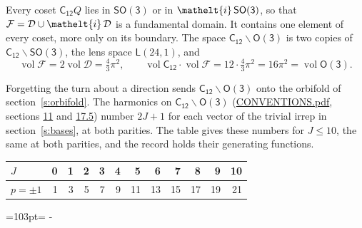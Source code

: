\documentclass[10pt,a4paper]{article}
\newcommand{\needspace}[1]{\par\penalty-100\begingroup\dimen0=#1\relax\dimen2=\pagegoal
  \advance\dimen2-\pagetotal\ifdim\dimen0>\dimen2\relax\ifdim\dimen2>0pt\vfil\break\fi\fi
  \endgroup}
\numberwithin{equation}{section}
\newcommand{\eltfont}[1]{{\let\sigma\eltsigma\mathelt{#1}}}
\newcommand{\grp}[1]{\mathsf{#1}}
\newcommand{\elt}[1]{\eltfont{#1}}
\newcommand{\vol}{\operatorname{vol}}
\newcommand{\fcell}{\mathcal{D}}
\newcommand{\fdomain}{\mathcal{F}}
\newcommand{\lensspace}[2]{\mathsf{L}(#1, #2)}
\begin{document}
\leavevmode\label{n:set.fundamental}Every coset $\grp{C_{12}}Q$ lies in \href{SO3.pdf}{$\grp{SO(3)}$} or in $\elt{i}\,\grp{SO(3)}$, so that $\fdomain = \fcell \cup \elt{i}\,\fcell$ is a fundamental domain. It contains one element of every coset, more only on its boundary.
\leavevmode\label{n:set.lens}The space $\grp{C_{12}}\backslash\grp{O(3)}$ is two copies of $\grp{C_{12}}\backslash\grp{SO(3)}$, the lens space $\lensspace{24}{1}$, and
\begin{equation}\label{e:volume}\vol\fdomain = 2\vol\fcell = \tfrac{4}{3}\pi^2,\qquad \vol\grp{C_{12}}\cdot\vol\fdomain = 12\cdot \tfrac{4}{3}\pi^2 = 16\pi^2 = \vol\grp{O(3)}.\end{equation}

Forgetting the turn about a direction sends $\grp{C_{12}}\backslash\grp{O(3)}$ onto the orbifold of section~\ref{s:orbifold}.
The harmonics on $\grp{C_{12}}\backslash\grp{O(3)}$ (\href{../../CONVENTIONS.pdf}{CONVENTIONS.pdf}, sections \href{../../CONVENTIONS.pdf\#conv.11}{11} and \href{../../CONVENTIONS.pdf\#conv.17.5}{17.5}) number $2J + 1$ for each vector of the trivial irrep in section~\ref{s:bases}, at both parities. The table gives these numbers for $J \le 10$, the same at both parities, and the record holds their generating functions.
{\small\setlength{\tabcolsep}{4pt}\begin{longtable}{@{}lrrrrrrrrrrr@{}}\toprule
$J$ & 0 & 1 & 2 & 3 & 4 & 5 & 6 & 7 & 8 & 9 & 10\\\midrule\endhead
\bottomrule\endfoot\endlastfoot
$p = \pm 1$ & 1 & 3 & 5 & 7 & 9 & 11 & 13 & 15 & 17 & 19 & 21\\
\bottomrule\end{longtable}}
\needspace{103pt}
\end{document}
